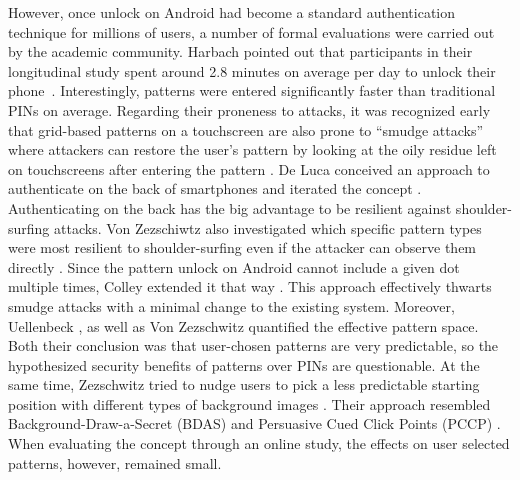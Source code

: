 	However, once unlock on Android had become a standard authentication technique for millions of users, a number of formal evaluations were carried out by the academic community. Harbach \etal pointed out that participants in their longitudinal study spent around 2.8 minutes on average per day to unlock their phone \cite{Harbach2016HardLockLife}. Interestingly, patterns were entered significantly faster than traditional PINs on average. 
	Regarding their proneness to attacks, it was recognized early that grid-based patterns on a touchscreen are also prone to ``smudge attacks'' where attackers can restore the user's pattern by looking at the oily residue left on touchscreens after entering the pattern \cite{Aviv2010SmudgeAttacks}. 
	De Luca \etal conceived an approach to authenticate on the back of smartphones and iterated the concept \cite{DeLuca2013BackOfDevice,DeLuca2014NowYouSeeMe}. Authenticating on the back has the big advantage to be resilient against shoulder-surfing attacks. Von Zezschiwtz \etal also investigated which specific pattern types were most resilient to shoulder-surfing even if the attacker can observe them directly \cite{VonZezschwitz2015EasyToDraw}. Since the pattern unlock on Android cannot include a given dot multiple times, Colley \etal extended it that way \cite{Colley2016ExtendingPatterns}. This approach effectively thwarts smudge attacks with a minimal change to the existing system. 
	Moreover, Uellenbeck \etal \cite{Uellenbeck2013QuantifyingSecurityPatterns}, as well as Von Zezschwitz \etal \cite{VonZezschwitz2016QuantifyingEffective} quantified the effective pattern space. Both their conclusion was that user-chosen patterns are very predictable, so the hypothesized security benefits of patterns over PINs are questionable. At the same time, Zezschwitz \etal tried to nudge users to pick a less predictable starting position with different types of background images \cite{VonZezschwitz2016QuantifyingEffective}. Their approach resembled Background-Draw-a-Secret (BDAS) \cite{Dunphy2007BDAS} and Persuasive Cued Click Points (PCCP) \cite{Chiasson2008PCCP}. When evaluating the concept through an online study, the effects on user selected patterns, however, remained small.

